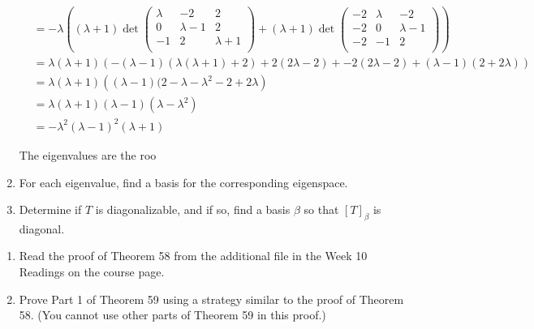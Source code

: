 \documentclass{eh-homework}
\begin{document}
\begin{question}{2}
\begin{enumerate}[label=(\alph*)]
\begin{align*}
            &= -\lambda \left( (\lambda + 1)\det \begin{pmatrix}
                \lambda & -2 &  2 \\
                0 & \lambda-1 &  2 \\
                -1 & 2 &  \lambda+1 \\
            \end{pmatrix} +(\lambda+1)\det \begin{pmatrix}
                -2 & \lambda &  -2 \\
                -2 & 0 &  \lambda-1 \\
                -2 & -1 &  2 \\
            \end{pmatrix} \right) \\
            &= \lambda(\lambda + 1)\left( -(\lambda - 1)(\lambda(\lambda+1) + 2) + 2(2\lambda - 2) + -2(2\lambda - 2) + (\lambda - 1)(2 + 2\lambda) \right) \\
            &= \lambda(\lambda+1)\left( (\lambda - 1)(2 - \lambda - \lambda^2 - 2 + 2\lambda\right) \\
            &=\lambda(\lambda+1)(\lambda - 1)(\lambda - \lambda^2) \\
            &= - \lambda^2 (\lambda - 1)^2 (\lambda + 1)
        \end{align*}

        The eigenvalues are the roo

        \item For each eigenvalue, find a basis for the corresponding eigenspace.
        \item Determine if $T$ is diagonalizable, and if so, find a basis $\beta$ so that $[T]_\beta$ is diagonal.
    \end{enumerate}
    \end{question}
    
    \begin{question}{3}
    \begin{enumerate}
        \item Read the proof of Theorem 58 from the additional file in the Week 10 Readings on the course page.
        \item Prove Part 1 of Theorem 59 using a strategy similar to the proof of Theorem 58. (You cannot use other parts of Theorem 59 in this proof.)
    \end{enumerate}
    \end{question}
    
\end{document}
